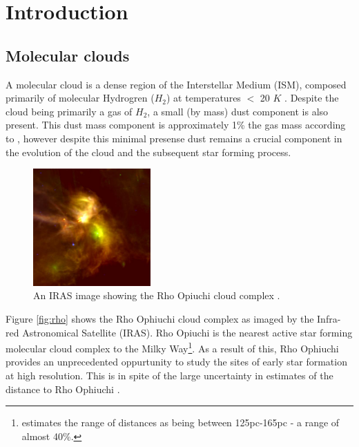\documentclass{report}
\begin{document}
\tableofcontents %
\pagebreak %

\listoffigures

\listoftables


\chapter{Introduction}

\section{Molecular clouds}
A molecular cloud is a dense region of the Interstellar Medium (ISM), composed primarily of molecular Hydrogren ($H_{2}$) at temperatures $<$ 20 $K$ \parencite{dustopacity}. Despite the cloud being primarily a gas of $H_{2}$, a small (by mass) dust component is also present. This dust mass component is approximately 1\% the gas mass according to \textcite{noise}, however despite this minimal presense dust remains a crucial component in the evolution of the cloud and the subsequent star forming process.

\begin{figure}
  \begin{center}
    \includegraphics[width=0.4\textwidth]{../img/rho.jpg}
    \caption[An IRAS image showing the Rho Opiuchi cloud complex \parencite{rho}.]{An IRAS image showing the Rho Opiuchi cloud complex \parencite{rho}.}
  \end{center}
\end{figure} \label{fig:rho}

Figure \ref{fig:rho} shows the Rho Ophiuchi cloud complex as imaged by the Infra-red Astronomical Satellite (IRAS). Rho Opiuchi is the nearest active star forming molecular cloud complex to the Milky Way\footnote{\textcite{rho-dist} estimates the range of distances as being between 125pc-165pc - a range of almost 40\%.}. As a result of this, Rho Ophiuchi provides an unprecedented oppurtunity to study the sites of early star formation at high resolution. This is in spite of the large uncertainty in estimates of the distance to Rho Ophiuchi \parencite{rho-dist}.
\end{document}
